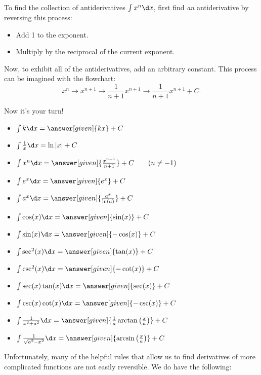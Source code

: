 \documentclass[nooutcomes]{ximera}
\begin{document}
To find the collection of antiderivatives $\int x^n \d x$, first find \emph{an} antiderivative by reversing this process:
\begin{itemize}
\item Add 1 to the exponent.
\item Multiply by the reciprocal of the current exponent.
\end{itemize}
Now, to exhibit all of the antiderivatives, add an arbitrary constant.  This process can be imagined with the flowchart: $$ x^n \longrightarrow x^{n+1} \longrightarrow \frac{1}{n+1}x^{n+1}  \longrightarrow \frac{1}{n+1}x^{n+1} +C.$$

Now it's your turn!


\begin{theorem}\hfil
\begin{itemize}
\item $\int k \d x= \answer[given]{k x}+C$
\item $\int \frac{1}{x} \d x= \ln|x|+C$
\item $\int x^n \d x= \answer[given]{\frac{x^{n+1}}{n+1}}+C\qquad(n\ne-1)$
\item $\int e^x \d x= \answer[given]{e^x} + C$
\item $\int a^x \d x= \answer[given]{\frac{a^x}{\ln(a)}}+C$
\item $\int \cos(x) \d x = \answer[given]{\sin(x)} + C$
\item $\int \sin(x) \d x = \answer[given]{-\cos(x)} + C$  
\item $\int \sec^2(x) \d x = \answer[given]{\tan(x)} + C$
\item $\int \csc^2(x) \d x = \answer[given]{-\cot(x)} + C$
\item $\int \sec(x)\tan(x) \d x = \answer[given]{\sec(x)} + C$
\item $\int \csc(x)\cot(x) \d x = \answer[given]{-\csc(x)} + C$
\item $\int \frac{1}{x^2+a^2}\d x = \answer[given]{\frac{1}{a}\arctan\left(\frac{x}{a}\right)} + C$
\item $\int \frac{1}{\sqrt{a^2-x^2}}\d x= \answer[given]{\arcsin\left(\frac{x}{a}\right)}+C$
\end{itemize}
\end{theorem}


Unfortunately, many of the helpful rules that allow us to find derivatives of more complicated functions are not easily reversible.  We do have the following:
\end{document}
